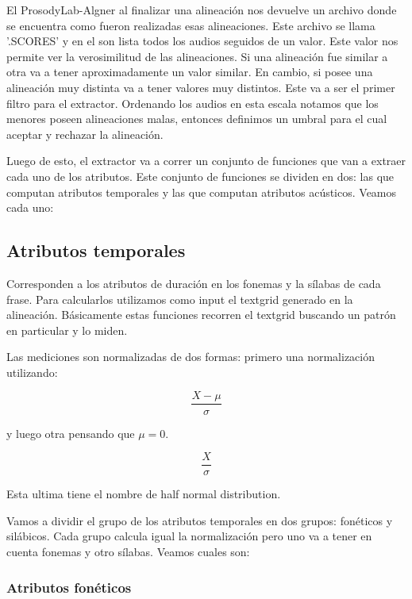 \documentclass[11pt,a4paper,twoside]{tesis}
\begin{document}
El ProsodyLab-Algner al finalizar una alineación nos devuelve un archivo donde se encuentra como fueron realizadas esas alineaciones. Este archivo se llama '.SCORES' y en el son lista todos los audios seguidos de un valor. Este valor nos permite ver la verosimilitud de las alineaciones. Si una alineación fue similar a otra va a tener aproximadamente un valor similar. En cambio, si posee una alineación muy distinta va a tener valores muy distintos. Este va a ser el primer filtro para el extractor. Ordenando los audios en esta escala notamos que los menores poseen alineaciones malas, entonces definimos un umbral para el cual aceptar y rechazar la alineación.

Luego de esto, el extractor va a correr un conjunto de funciones que van a extraer cada uno de los atributos. Este conjunto de funciones se dividen en dos: las que computan atributos temporales y las que computan atributos acústicos. Veamos cada uno:

\subsection{Atributos temporales}

Corresponden a los atributos de duración en los fonemas y la sílabas de cada frase. Para calcularlos utilizamos como input el textgrid generado en la alineación. Básicamente estas funciones recorren el textgrid buscando un patrón en particular y lo miden.

Las mediciones son normalizadas de dos formas: primero una normalización utilizando:

\hspace{2cm} \[\frac{X - \mu }{ \sigma }\]

y luego otra pensando que $\mu = 0$. 

\hspace{2cm} \[\frac{X}{ \sigma }\]

Esta ultima tiene el nombre de half normal distribution.


Vamos a dividir el grupo de los atributos temporales en dos grupos: fonéticos y silábicos. Cada grupo calcula igual la normalización pero uno va a tener en cuenta fonemas y otro sílabas. Veamos cuales son:

\subsubsection{Atributos fonéticos}
\end{document}
